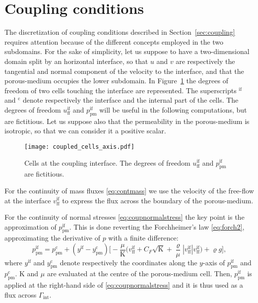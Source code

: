 \section{Coupling conditions}
The discretization of coupling conditions described in 
Section~\ref{sec:coupling} requires attention because of the different concepts 
employed in the two subdomains. For the sake of simplicity, let us suppose to 
have a two-dimensional domain split by an horizontal interface, so that $u$ and 
$v$ are respectively the tangential and normal component of the velocity to the 
interface, and that the porous-medium occupies the lower subdomain. In 
Figure~\ref{fig:coupledcells} the degrees of freedom of two cells touching 
the interface are represented. The superscripts $^\text{if}$ and $^\text{c}$ 
denote respectively the interface and the internal part of the cells. The 
degrees of freedom $u_\text{ff}^\text{if}$ and $p_\text{pm}^\text{if}$ will be 
useful in the following computations, but are fictitious. Let us suppose also 
that the permeability in the porous-medium is isotropic, so that we can 
consider it a positive scalar.
\begin{figure}
	\centering
	\texttt{[image: coupled\_cells\_axis.pdf]}
	\caption[Cells at the coupling interface]{Cells at the coupling interface. 
	The degrees of freedom $u_\text{ff}^\text{if}$ and $p_\text{pm}^\text{if}$ 
	are fictitious.}
	\label{fig:coupledcells}
\end{figure}

For the continuity of mass fluxes \eqref{eq:contmass} we use the velocity of 
the free-flow at the interface $v_\text{ff}^\text{if}$ to express the flux 
across the boundary of the porous-medium.

For the continuity of normal stresses \eqref{eq:coupnormalstress} the key point 
is the approximation of $p_\text{pm}^\text{if}$. This is done reverting 
the Forchheimer's law \eqref{eq:forch2}, approximating the derivative of $p$ 
with a finite difference:
\begin{equation}
	p_\text{pm}^\text{if} = 
	p_\text{pm}^\text{c}+(y^\text{if}-y_\text{pm}^\text{c}) 
	\Big[-\frac{\mu}{\mathrm{K}}\big(v_\text{ff}^\text{if} 
	+C_F\sqrt{\mathrm{K}}+ 
	\frac{\varrho}{\mu}|v_\text{ff}^\text{if}| 
	v_\text{ff}^\text{if}\big)+\varrho
	 g\Big],
\end{equation}
where $y^\text{if}$ and $y^\text{c}_\text{pm}$ denote respectively the coordinates along the $y$-axis of $p^\text{if}_\text{pm}$ and $p^\text{c}_\text{pm}$.
$\mathrm{K}$ and $\mu$ are evaluated at the centre of the porous-medium cell. 
Then, $p_\text{pm}^\text{if}$ is applied at the right-hand side of 
\eqref{eq:coupnormalstress} and it is thus used as a flux across 
$\Gamma_\text{int}$.


